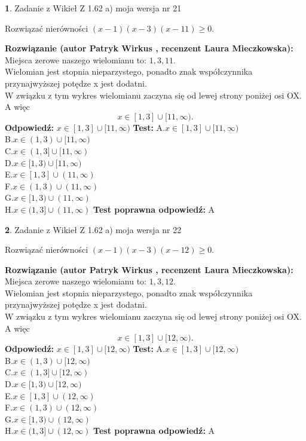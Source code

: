 \documentclass[12pt, a4paper]{article}
\theoremstyle{definition} %
\newtheorem{zad}{}
\newcommand{\zadStart}[1]{\begin{zad}#1\newline}
\newcommand{\zadStop}{\end{zad}}
\newcommand{\rozwStart}[2]{\noindent \textbf{Rozwiązanie (autor #1 , recenzent #2): }\newline}
\newcommand{\rozwStop}{\newline}
\newcommand{\odpStart}{\noindent \textbf{Odpowiedź:}\newline}
\newcommand{\odpStop}{\newline}
\newcommand{\testStart}{\noindent \textbf{Test:}\newline}
\newcommand{\testStop}{\newline}
\newcommand{\kluczStart}{\noindent \textbf{Test poprawna odpowiedź:}\newline}
\newcommand{\kluczStop}{\newline}
\begin{document}
\zadStart{Zadanie z Wikieł Z 1.62 a) moja wersja nr 21}

Rozwiązać nierówności $(x-1)(x-3)(x-11)\ge0$.
\zadStop
\rozwStart{Patryk Wirkus}{Laura Mieczkowska}
Miejsca zerowe naszego wielomianu to: $1, 3, 11$.\\
Wielomian jest stopnia nieparzystego, ponadto znak współczynnika przy\linebreak najwyższej potędze x jest dodatni.\\ W związku z tym wykres wielomianu zaczyna się od lewej strony poniżej osi OX. A więc $$x \in [1,3] \cup [11,\infty).$$
\rozwStop
\odpStart
$x \in [1,3] \cup [11,\infty)$
\odpStop
\testStart
A.$x \in [1,3] \cup [11,\infty)$\\
B.$x \in (1,3) \cup [11,\infty)$\\
C.$x \in (1,3] \cup [11,\infty)$\\
D.$x \in [1,3) \cup [11,\infty)$\\
E.$x \in [1,3] \cup (11,\infty)$\\
F.$x \in (1,3) \cup (11,\infty)$\\
G.$x \in [1,3) \cup (11,\infty)$\\
H.$x \in (1,3] \cup (11,\infty)$
\testStop
\kluczStart
A
\kluczStop



\zadStart{Zadanie z Wikieł Z 1.62 a) moja wersja nr 22}

Rozwiązać nierówności $(x-1)(x-3)(x-12)\ge0$.
\zadStop
\rozwStart{Patryk Wirkus}{Laura Mieczkowska}
Miejsca zerowe naszego wielomianu to: $1, 3, 12$.\\
Wielomian jest stopnia nieparzystego, ponadto znak współczynnika przy\linebreak najwyższej potędze x jest dodatni.\\ W związku z tym wykres wielomianu zaczyna się od lewej strony poniżej osi OX. A więc $$x \in [1,3] \cup [12,\infty).$$
\rozwStop
\odpStart
$x \in [1,3] \cup [12,\infty)$
\odpStop
\testStart
A.$x \in [1,3] \cup [12,\infty)$\\
B.$x \in (1,3) \cup [12,\infty)$\\
C.$x \in (1,3] \cup [12,\infty)$\\
D.$x \in [1,3) \cup [12,\infty)$\\
E.$x \in [1,3] \cup (12,\infty)$\\
F.$x \in (1,3) \cup (12,\infty)$\\
G.$x \in [1,3) \cup (12,\infty)$\\
H.$x \in (1,3] \cup (12,\infty)$
\testStop
\kluczStart
A
\kluczStop
\end{document}
